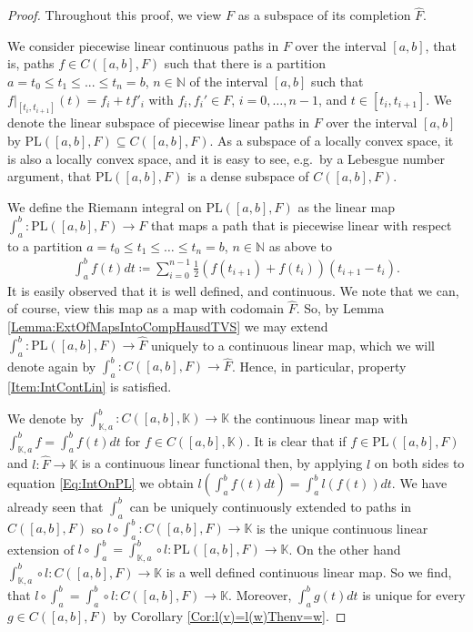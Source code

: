 \documentclass[12pt,a4paper]{article}
\theoremstyle{plain}
\theoremstyle{definition}
\newcommand{\N}{\mathbb{N}}
\newcommand{\K}{\mathbb{K}}
\begin{document}
\begin{proof}
Throughout this proof, we view $F$ as a subspace of its completion $\hat F$.

We consider piecewise linear continuous paths in $F$ over the interval $[a,b]$, that is, paths $f\in C([a,b],F)$ such that there is a partition $a=t_0\leq t_1\leq ... \leq t_n=b$, $n\in \N$ of the interval $[a,b]$ such that $\left.f\right|_{[t_{i},t_{i+1}]}(t)=f_i+tf'_i$ with $f_i,f_i'\in F$, $i=0,\ldots,n-1$, and $t\in [t_i,t_{i+1}]$. We denote the linear subspace of piecewise linear paths in $F$ over the interval $[a,b]$ by $\mathrm{PL}([a,b],F)\subseteq C([a,b],F)$. As a subspace of a locally convex space, it is also a locally convex space, and it is easy to see, e.g.~by a Lebesgue number argument, that $\mathrm{PL}([a,b],F)$ is a dense subspace of $C([a,b],F)$. 

We define the Riemann integral on $\mathrm{PL}([a,b],F)$ as the linear map 
$\int_a^b: \mathrm{PL}([a,b],F)\to F$ that maps a path that is piecewise linear with respect to a partition $a=t_0\leq t_1\leq \ldots \leq t_n=b$, $n\in \N$ as above to 
\begin{align}
\label{Eq:IntOnPL}
    \int_a^bf(t)dt\coloneqq \sum_{i=0}^{n-1}\frac{1}{2}(f(t_{i+1})+f(t_i))(t_{i+1}-t_i).
\end{align}
It is easily observed that it is well defined, and continuous.
We note that we can, of course, view this map as a map with codomain $\hat F$. So, by Lemma \ref{Lemma:ExtOfMapsIntoCompHausdTVS} we may extend $\int_a^b:\mathrm{PL}([a,b],F)\to \hat F$ uniquely to a continuous linear map, which we will denote again by $\int_a^b:C([a,b],F)\to \hat F$. Hence, in particular, property \ref{Item:IntContLin} is satisfied.

We denote by $\int_{\K,a}^b:C([a,b],\K)\to \K$ the continuous linear map with $\int_{\K,a}^bf=\int_a^bf(t)dt$ for $f\in C([a,b],\K)$. It is clear that if $f\in \mathrm{PL}([a,b],F)$ and $l:\hat F\to \K$ is a continuous linear functional then, by applying $l$ on both sides to equation \eqref{Eq:IntOnPL} we obtain
$l\left(\int_a^bf(t)dt\right)=\int_a^bl(f(t))dt$.
We have already seen that $\int_a^b$ can be uniquely continuously extended to paths in $C([a,b],F)$ so $l\circ \int_a^b:C([a,b],F)\to \K$ is the unique continuous linear extension of $l\circ\int_a^b=\int_{\K,a}^b\circ l:\mathrm{PL}([a,b],F)\to \K$. On the other hand
$\int_{\K,a}^b\circ l:C([a,b],F)\to \K$ is a well defined continuous linear map. 
So we find, that
$l\circ \int_a^b=\int_a^b\circ l:C([a,b],F)\to \K$. Moreover, $\int_a^bg(t)dt$ is unique for every $g\in C([a,b],F)$ by Corollary \ref{Cor:l(v)=l(w)Thenv=w}.


\end{proof}
\end{document}
